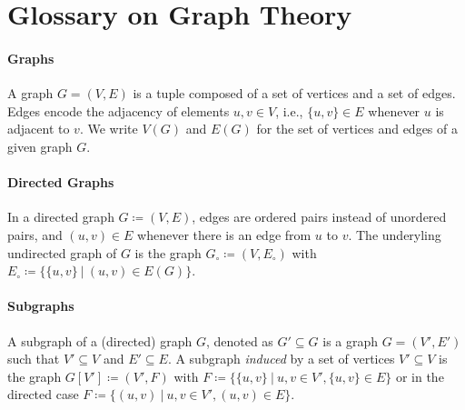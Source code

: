 \documentclass[pdflatex]{sn-jnl}
\theoremstyle{thmstyleone}%
\theoremstyle{examplesty}%
\theoremstyle{thmstylethree}%
\begin{document}






\maketitle

\section{Glossary on Graph Theory}\label{sec:Glossary}

\paragraph{Graphs} A graph $G=(V,E)$ is a tuple composed of a set of vertices and 
a set of edges. Edges encode the adjacency of elements $u,v\in V$, i.e., $\{u,v\}\in E$ 
whenever $u$ is adjacent to $v$. We write $V(G)$ and $E(G)$ for the set of vertices 
and edges of a given graph $G$.
 
\paragraph{Directed Graphs} In a directed graph $G\coloneqq (V,E)$, edges are ordered 
pairs instead of unordered pairs, and $(u,v) \in E$ whenever there is an edge from $u$ to 
$v$. The underyling undirected graph of $G$ is the graph $G_{\circ} \coloneqq (V, E_{\circ})$ with
$E_{\circ}\coloneqq \{ \{u,v\} \ \vert \ (u,v) \in E(G) \}$.

\paragraph{Subgraphs} A subgraph of a (directed) graph $G$, denoted as $G'\subseteq G$ is a graph $G=(V', E')$ 
such that $V'\subseteq V$ and $E'\subseteq E$. A subgraph \emph{induced} by a set of vertices 
$V'\subseteq V$ is the graph $G[V']\coloneqq (V', F)$ with $F\coloneqq \{ \{u,v\} \ \vert \ u,v\in V', 
\{u,v\} \in E\}$ or in the directed case $F\coloneqq \{(u,v) \ \vert \ u,v\in V', (u,v) \in E\}$.
\end{document}
